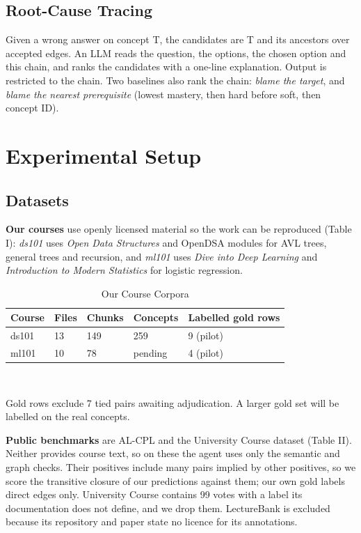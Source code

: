 \documentclass[conference]{IEEEtran}
\begin{document}
\subsection{Root-Cause Tracing}
Given a wrong answer on concept T, the candidates are T and its ancestors over accepted edges. An LLM reads the question, the options, the chosen option and this chain, and ranks the candidates with a one-line explanation. Output is restricted to the chain. Two baselines also rank the chain: \emph{blame the target}, and \emph{blame the nearest prerequisite} (lowest mastery, then hard before soft, then concept ID).

\section{Experimental Setup}
\subsection{Datasets}
\textbf{Our courses} use openly licensed material so the work can be reproduced (Table I): \emph{ds101} uses \emph{Open Data Structures} \cite{ods} and OpenDSA modules \cite{opendsa} for AVL trees, general trees and recursion, and \emph{ml101} uses \emph{Dive into Deep Learning} \cite{d2l} and \emph{Introduction to Modern Statistics} \cite{ims} for logistic regression.

\begin{table}[!t]
\caption{Our Course Corpora}
\centering\footnotesize
\begin{tabular}{@{}p{}p{}p{}p{}p{}@{}}
\toprule
\textbf{Course} & \textbf{Files} & \textbf{Chunks} & \textbf{Concepts} & \textbf{Labelled gold rows} \\ \midrule
ds101 & 13 & 149 & 259 & 9 (pilot) \\
ml101 & 10 & 78 & pending & 4 (pilot) \\
\bottomrule
\end{tabular}
\\[2pt]\parbox{0.95\columnwidth}{\scriptsize Gold rows exclude 7 tied pairs awaiting adjudication. A larger gold set will be labelled on the real concepts.}
\end{table}
\textbf{Public benchmarks} are AL-CPL \cite{liang18} and the University Course dataset \cite{liang17} (Table II). Neither provides course text, so on these the agent uses only the semantic and graph checks. Their positives include many pairs implied by other positives, so we score the transitive closure of our predictions against them; our own gold labels direct edges only. University Course contains 99 votes with a label its documentation does not define, and we drop them. LectureBank \cite{lecturebank} is excluded because its repository and paper state no licence for its annotations.
\end{document}
